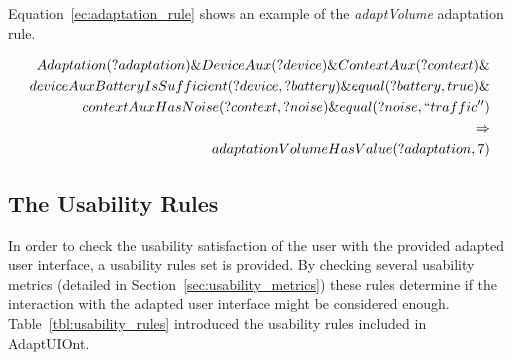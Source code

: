 Equation~\ref{ec:adaptation_rule} shows an example of the \textit{adaptVolume} 
adaptation rule.

\footnotesize
\begin{equation} \label{ec:adaptation_rule}
  \begin{align*} 
  Adaptation(?adaptation) \& DeviceAux(?device) \& ContextAux(?context) \& \\
  deviceAuxBatteryIsSufficient(?device, ?battery) \& equal(?battery, true) \& \\
  contextAuxHasNoise(?context, ?noise) \& equal(?noise, ``traffic'')\\ 
  \Rightarrow \\
  adaptationVolumeHasValue(?adaptation, 7)\\
  \end{align*}
\end{equation}
\normalsize


\subsection{The Usability Rules}
In order to check the usability satisfaction of the user with the provided
adapted user interface, a usability rules set is provided. By checking several
usability metrics (detailed in Section~\ref{sec:usability_metrics}) these rules
determine if the interaction with the adapted user interface might be considered
enough. Table~\ref{tbl:usability_rules} introduced the usability rules included
in AdaptUIOnt.

